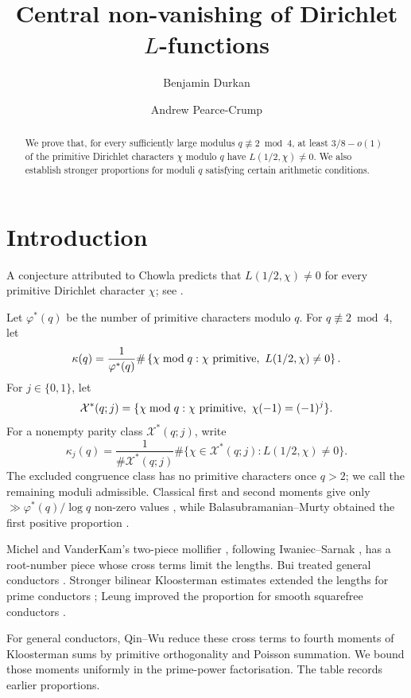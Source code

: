 \documentclass[12pt, a4paper]{amsart}
\title[Central non-vanishing of Dirichlet $L$-functions]{Central non-vanishing of Dirichlet $L$-functions}
\author[B. Durkan]{Benjamin Durkan}
\author[A. Pearce-Crump]{Andrew Pearce-Crump}
\date{}
\numberwithin{equation}{section}
\theoremstyle{plain}
\begin{document}
\begin{abstract}
We prove that, for every sufficiently large modulus $q\not\equiv2\bmod4$, at least $3/8-o(1)$ of the primitive Dirichlet characters $\chi$ modulo $q$ have $L(1/2,\chi)\ne0$. We also establish stronger proportions for moduli $q$ satisfying certain arithmetic conditions.
\end{abstract}
\maketitle

\section{Introduction}\label{sec:introduction}

A conjecture attributed to Chowla predicts that $L(1/2,\chi)\ne0$ for every primitive Dirichlet character $\chi$; see \cite{CechMat}.

Let $\varphi^*(q)$ be the number of primitive characters modulo $q$. For $q\not\equiv2\bmod4$, let
$$
\kappa(q)=\frac{1}{\varphi^*(q)}
\#\left\{\chi\bmod q:\chi\hbox{ primitive},\ L(1/2,\chi)\ne0\right\}.
$$
For $j\in\{0,1\}$, let
$$
\mathcal X^*(q;j)=
\{\chi\bmod q:\chi\hbox{ primitive},\ \chi(-1)=(-1)^j\}.
$$
For a nonempty parity class $\mathcal X^*(q;j)$, write
$$
\kappa_j(q)=\frac{1}{\#\mathcal X^*(q;j)}
\#\{\chi\in\mathcal X^*(q;j):L(1/2,\chi)\ne0\}.
$$
 The excluded congruence class has no primitive characters once $q>2$; we call the remaining moduli admissible. Classical first and second moments give only $\gg\varphi^*(q)/\log q$ non-zero values \cite{Paley}, while Balasubramanian--Murty obtained the first positive proportion \cite{BM}.

Michel and VanderKam's two-piece mollifier \cite{MV}, following Iwaniec--Sarnak \cite{IS}, has a root-number piece whose cross terms limit the lengths. Bui treated general conductors \cite{Bui}. Stronger bilinear Kloosterman estimates extended the lengths for prime conductors \cite{KhanNgo,KMN}; Leung improved the proportion for smooth squarefree conductors \cite{Leung}.

For general conductors, Qin--Wu \cite{QW} reduce these cross terms to fourth moments of Kloosterman sums by primitive orthogonality and Poisson summation. We bound those moments uniformly in the prime-power factorisation. The table records earlier proportions.
\end{document}
